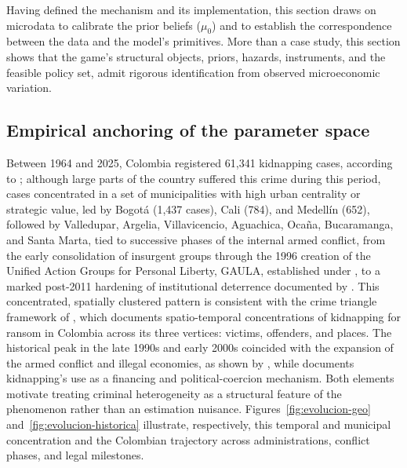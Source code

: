\documentclass[review,authoryear,12pt]{elsarticle}
\theoremstyle{plain}
\theoremstyle{definition}
\newcommand{\1}{\mathbf{1}}
\begin{document}
Having defined the mechanism and its implementation, this section draws on microdata to calibrate the prior beliefs ($\mu_0$) and to establish the correspondence between the data and the model's primitives. More than a case study, this section shows that the game's structural objects, priors, hazards, instruments, and the feasible policy set, admit rigorous identification from observed microeconomic variation.

\subsection{Empirical anchoring of the parameter space}\label{sec:institutional}

Between 1964 and 2025, Colombia registered 61,341 kidnapping cases, according to \citet{cnmh_datos}; although large parts of the country suffered this crime during this period, cases concentrated in a set of municipalities with high urban centrality or strategic value, led by Bogotá (1,437 cases), Cali (784), and Medellín (652), followed by Valledupar, Argelia, Villavicencio, Aguachica, Ocaña, Bucaramanga, and Santa Marta, tied to successive phases of the internal armed conflict, from the early consolidation of insurgent groups through the 1996 creation of the Unified Action Groups for Personal Liberty, GAULA, established under \citet{ley282_1996}, to a marked post-2011 hardening of institutional deterrence documented by \citet{CNMH2013}. This concentrated, spatially clustered pattern is consistent with the crime triangle framework of \citet{Pires2014}, which documents spatio-temporal concentrations of kidnapping for ransom in Colombia across its three vertices: victims, offenders, and places. The historical peak in the late 1990s and early 2000s coincided with the expansion of the armed conflict and illegal economies, as shown by \citet{pinto2004}, while \citet{Zarate2007} documents kidnapping's use as a financing and political-coercion mechanism. Both elements motivate treating criminal heterogeneity as a structural feature of the phenomenon rather than an estimation nuisance. Figures~\ref{fig:evolucion-geo} and~\ref{fig:evolucion-historica} illustrate, respectively, this temporal and municipal concentration and the Colombian trajectory across administrations, conflict phases, and legal milestones.
\end{document}
